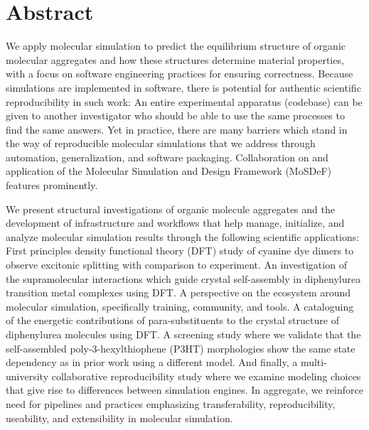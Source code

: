 
\chapter*{Abstract}

We apply molecular simulation to predict the equilibrium structure of organic molecular aggregates and how these structures determine material properties, with a focus on software engineering practices for ensuring correctness.
Because simulations are implemented in software, there is potential for authentic scientific reproducibility in such work: An entire experimental apparatus (codebase) can be given to another investigator who should be able to use the same processes to find the same answers.
Yet in practice, there are many barriers which stand in the way of reproducible molecular simulations that we address through automation, generalization, and software packaging. 
Collaboration on and application of the  Molecular Simulation and Design Framework (MoSDeF) features prominently.

We present structural investigations of organic molecule aggregates and the development of infrastructure and workflows that help manage, initialize, and analyze molecular simulation results through the following scientific applications:
First principles density functional theory (DFT) study of cyanine dye dimers to observe excitonic splitting with comparison to experiment.
An investigation of the supramolecular interactions which guide crystal self-assembly in diphenylurea transition metal complexes using DFT.
A perspective on the ecosystem around molecular simulation, specifically training, community, and tools.
A cataloguing of the energetic contributions of para-substituents to the crystal structure of diphenylurea molecules using DFT.
A screening study where we validate that the self-assembled poly-3-hexylthiophene (P3HT) morphologies show the same state dependency as in prior work using a different model.
And finally, a multi-university collaborative reproducibility study where we examine modeling choices that give rise to differences between simulation engines.
In aggregate, we reinforce need for pipelines and practices emphasizing transferability, reproducibility, useability, and extensibility in molecular simulation.
